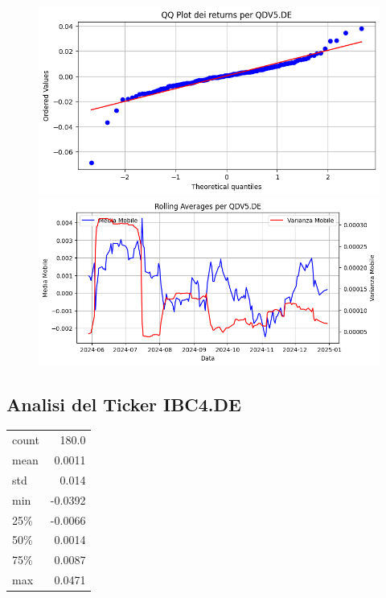 \documentclass{article}%
\begin{document}
%


\begin{figure}[htbp]%
\begin{minipage}{0.48\textwidth}%
\includegraphics[width=\linewidth]{immagini_tickers/QDV5.DE_qq_plot.png}%
\end{minipage}%
\begin{minipage}{0.48\textwidth}%
\includegraphics[width=\linewidth]{immagini_tickers/QDV5.DE_rolling_averages.png}%
\end{minipage}%
\end{figure}

%
\subsection*{Analisi del Ticker IBC4.DE}%
\label{subsec:AnalisidelTickerIBC4.DE}%
\begin{tabular}{lr}%
count&180.0\\%
mean&0.0011\\%
std&0.014\\%
min&{-}0.0392\\%
25\%&{-}0.0066\\%
50\%&0.0014\\%
75\%&0.0087\\%
max&0.0471\\%
\end{tabular}%
\end{document}
